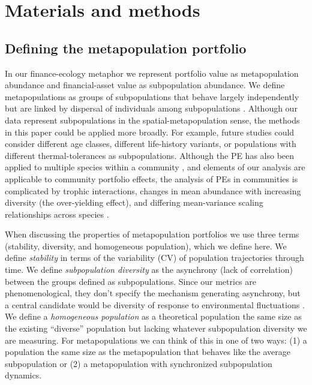 \section{Materials and methods}

\subsection{Defining the metapopulation portfolio}

In our finance-ecology metaphor we represent portfolio value as
metapopulation abundance and financial-asset value as subpopulation abundance.
We define metapopulations as groups of subpopulations that behave largely
independently but are linked by dispersal of individuals among subpopulations
\citep{levins1969}.
Although our data represent subpopulations in the spatial-metapopulation
sense, the methods in this paper could be applied more broadly.
For example, future studies could consider different age classes, different
life-history variants, or populations with different thermal-tolerances as
subpopulations.
Although the PE has also been applied to multiple species within a
community \citep[e.g.][]{doak1998, tilman1998, karp2011}, and
elements of our analysis are applicable to community portfolio effects, the
analysis of PEs in communities is complicated by trophic interactions, changes
in mean abundance with increasing diversity (the over-yielding effect), and
differing mean-variance scaling relationships across species
\citep[e.g.][]{loreau2010, thibaut2012}.

When discussing the properties of metapopulation portfolios we use
three terms (stability, diversity, and homogeneous population), which we define
here.
We define \textit{stability} in terms of the variability (CV) of population
trajectories through time.
We define \textit{subpopulation diversity} as the asynchrony (lack of
correlation) between the groups defined as subpopulations.
Since our metrics are phenomenological, they don't specify the mechanism
generating asynchrony, but a central candidate would be diversity of response
to environmental fluctuations
\citep[e.g.][]{elmqvist2003,loreau2008,thibaut2011}.
We define a \textit{homogeneous population} as a theoretical population the
same size as the existing ``diverse'' population but lacking whatever
subpopulation diversity we are measuring. For metapopulations we can think of
this in one of two ways: (1) a population the same size as the metapopulation
that behaves like the average subpopulation or (2) a metapopulation with synchronized
subpopulation dynamics.

